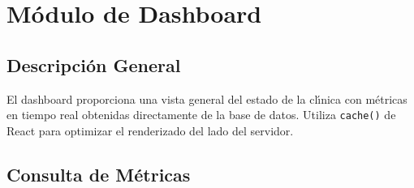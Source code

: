 \chapter{M\'odulo de Dashboard}

\section{Descripci\'on General}

El dashboard proporciona una vista general del estado de la cl\'{\i}nica
con m\'etricas en tiempo real obtenidas directamente de la base de datos.
Utiliza \texttt{cache()} de React para optimizar el renderizado del lado
del servidor.

\section{Consulta de M\'etricas}

